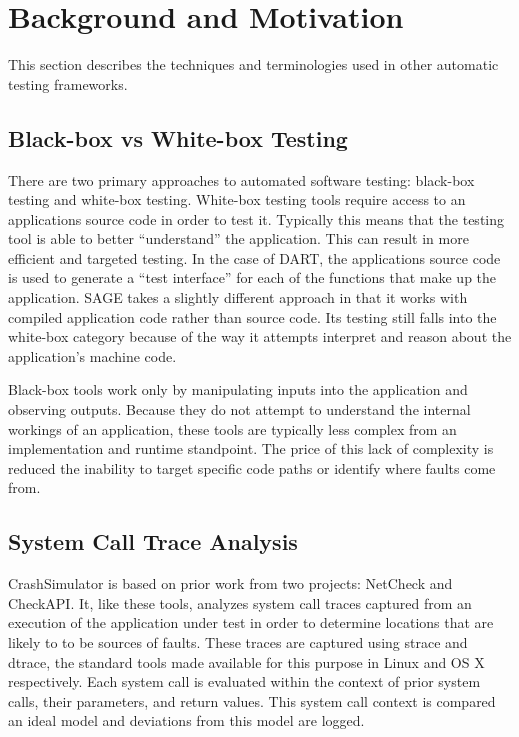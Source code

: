 

\section{Background and Motivation}

    This section describes the techniques and terminologies used in other automatic testing frameworks.

    \subsection{Black-box vs White-box Testing}

        There are two primary approaches to automated software testing: black-box testing and white-box testing.
        White-box testing tools require access to an applications source code in order to test it. Typically this means
        that the testing tool is able to better ``understand'' the application. This can result in more efficient and
        targeted testing. In the case of DART, the applications source code is used to generate a ``test interface'' for
        each of the functions that make up the application. SAGE takes a slightly different approach in that it works
        with compiled application code rather than source code. Its testing still falls into the white-box category
        because of the way it attempts interpret and reason about the application's machine code.

        Black-box tools work only by manipulating inputs into the application and observing outputs. Because they do not
        attempt to understand the internal workings of an application, these tools are typically less complex from an
        implementation and runtime standpoint. The price of this lack of complexity is reduced the inability to target
        specific code paths or identify where faults come from.

    \subsection{System Call Trace Analysis}

        CrashSimulator is based on prior work from two projects: NetCheck and CheckAPI. It, like these tools, analyzes
        system call traces captured from an execution of the application under test in order to determine locations that
        are likely to to be sources of faults. These traces are captured using strace and dtrace, the standard tools
        made available for this purpose in Linux and OS X respectively. Each system call is evaluated within the context
        of prior system calls, their parameters, and return values. This system call context is compared an ideal model
        and deviations from this model are logged.

